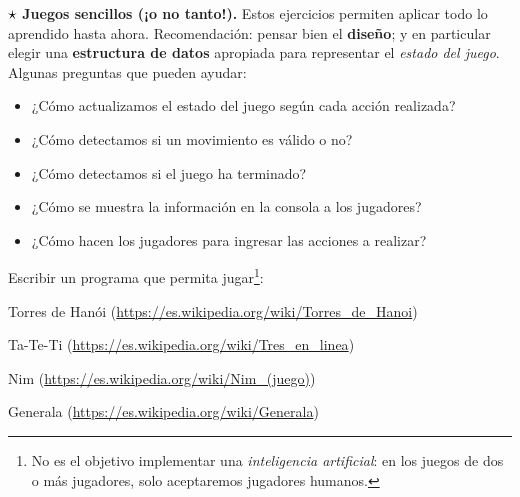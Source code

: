 \begin{ejercicio}
$\dificil$ {\bf Juegos sencillos (¡o no tanto!).}
Estos ejercicios permiten aplicar todo lo aprendido hasta ahora.
Recomendación: pensar bien el {\bf diseño}; y en particular elegir una {\bf
estructura de datos} apropiada para representar el
\emph{estado del juego}. Algunas preguntas que pueden ayudar:
\begin{itemize}
\item ¿Cómo actualizamos el estado del juego según cada acción realizada?
\item ¿Cómo detectamos si un movimiento es válido o no?
\item ¿Cómo detectamos si el juego ha terminado?
\item ¿Cómo se muestra la información en la consola a los jugadores?
\item ¿Cómo hacen los jugadores para ingresar las acciones a realizar?
\end{itemize}

\noindent Escribir un programa que permita jugar\footnote{No es el objetivo
implementar una \emph{inteligencia artificial}: en los juegos de dos o más
jugadores, solo aceptaremos jugadores humanos.}:
\begin{partes}
\item Torres de Hanói (\url{https://es.wikipedia.org/wiki/Torres_de_Hanoi})
\item Ta-Te-Ti (\url{https://es.wikipedia.org/wiki/Tres_en_linea})
\item Nim (\url{https://es.wikipedia.org/wiki/Nim_(juego)})
\item Generala (\url{https://es.wikipedia.org/wiki/Generala})
\end{partes}
\end{ejercicio}

